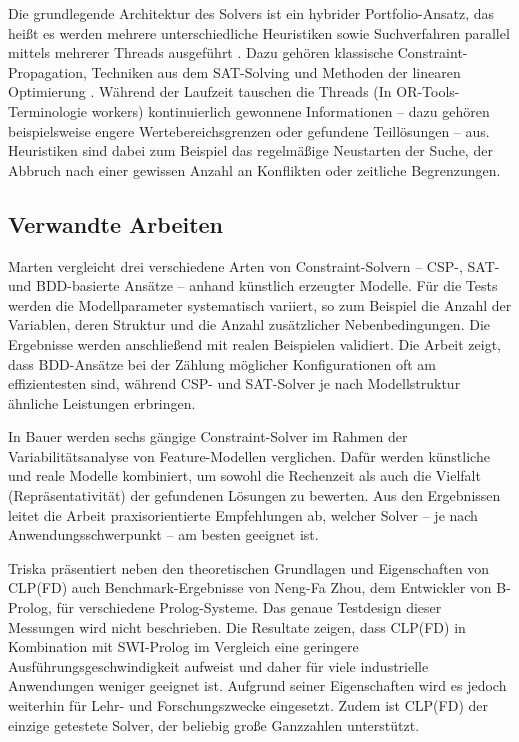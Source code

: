 \documentclass[12pt,a4paper]{article}
\begin{document}
Die grundlegende Architektur des Solvers ist ein hybrider Portfolio-Ansatz, das heißt es werden mehrere unterschiedliche Heuristiken sowie Suchverfahren parallel mittels mehrerer Threads ausgeführt \cite{perron}.
Dazu gehören klassische Constraint-Propagation, Techniken aus dem SAT-Solving und Methoden der linearen Optimierung \cite{cp-sat-primer}.
Während der Laufzeit tauschen die Threads (In OR-Tools-Terminologie \glqq workers\grqq{}) kontinuierlich gewonnene Informationen -- dazu gehören beispielsweise engere Wertebereichsgrenzen oder gefundene Teillösungen -- aus.
Heuristiken sind dabei zum Beispiel das regelmäßige Neustarten der Suche, der Abbruch nach einer gewissen Anzahl an Konflikten oder zeitliche Begrenzungen.

\subsection{Verwandte Arbeiten}
Marten \cite{marten2018} vergleicht drei verschiedene Arten von Constraint-Solvern – CSP-, SAT- und BDD-basierte Ansätze – anhand künstlich erzeugter Modelle.
Für die Tests werden die Modellparameter systematisch variiert, so zum Beispiel die Anzahl der Variablen, deren Struktur und die Anzahl zusätzlicher Nebenbedingungen.
Die Ergebnisse werden anschließend mit realen Beispielen validiert.
Die Arbeit zeigt, dass BDD-Ansätze bei der Zählung möglicher Konfigurationen oft am effizientesten sind, während CSP- und SAT-Solver je nach Modellstruktur ähnliche Leistungen erbringen.

In Bauer \cite{bauer2019} werden sechs gängige Constraint-Solver im Rahmen der Variabilitätsanalyse von Feature-Modellen verglichen.
Dafür werden künstliche und reale Modelle kombiniert, um sowohl die Rechenzeit als auch die Vielfalt (Repräsentativität) der gefundenen Lösungen zu bewerten.
Aus den Ergebnissen leitet die Arbeit praxisorientierte Empfehlungen ab, welcher Solver – je nach Anwendungsschwerpunkt – am besten geeignet ist.

Triska \cite{drt} präsentiert neben den theoretischen Grundlagen und Eigenschaften von CLP(FD) auch Benchmark-Ergebnisse von Neng-Fa Zhou, dem Entwickler von B-Prolog, für verschiedene Prolog-Systeme.
Das genaue Testdesign dieser Messungen wird nicht beschrieben.
Die Resultate zeigen, dass CLP(FD) in Kombination mit SWI-Prolog im Vergleich eine geringere Ausführungsgeschwindigkeit aufweist und daher für viele industrielle Anwendungen weniger geeignet ist.
Aufgrund seiner Eigenschaften wird es jedoch weiterhin für Lehr- und Forschungszwecke eingesetzt.
Zudem ist CLP(FD) der einzige getestete Solver, der beliebig große Ganzzahlen unterstützt. 
\end{document}
